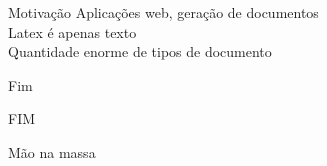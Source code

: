\documentclass{beamer}
\begin{document}
  \begin{frame}{Motivação} 
     Aplicações web, geração de documentos\\\pause
    \onslide<2>{$ \nabla $} Latex é apenas texto\\\pause
     Quantidade enorme de tipos de documento\\
  \end{frame}
  \begin{frame}{Fim} 
    \begin{center} \selectfont \Huge FIM \end{center}
  \end{frame}
  \begin{frame}{Mão na massa} 
    \begin{center} \href{https://github.com/jacott/rails-latex}{} \end{center}
  \end{frame}
  \begin{frame}[plain] 
    \titlepage
  \end{frame}
\end{document}
